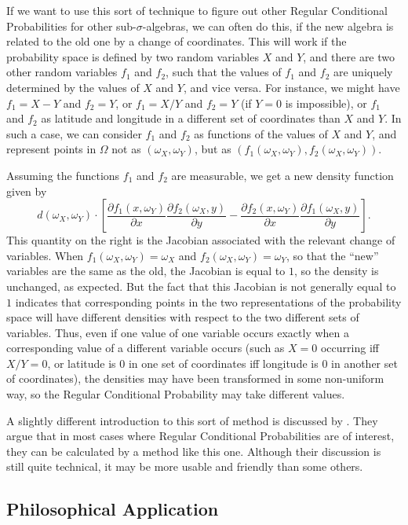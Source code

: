 If we want to use this sort of technique to figure out other Regular Conditional Probabilities for other sub-$\sigma$-algebras, we can often do this, if the new algebra is related to the old one by a change of coordinates. This will work if the probability space is defined by two random variables $X$ and $Y$, and there are two other random variables $f_1$ and $f_2$, such that the values of $f_1$ and $f_2$ are uniquely determined by the values of $X$ and $Y$, and vice versa. For instance, we might have $f_1=X-Y$ and $f_2=Y$, or $f_1=X/Y$ and $f_2=Y$ (if $Y=0$ is impossible), or $f_1$ and $f_2$ as latitude and longitude in a different set of coordinates than $X$ and $Y$. In such a case, we can consider $f_1$ and $f_2$ as functions of the values of $X$ and $Y$, and represent points in $\Omega$ not as $(\omega_X,\omega_Y)$, but as $(f_1(\omega_X,\omega_Y),f_2(\omega_X,\omega_Y))$.

Assuming the functions $f_1$ and $f_2$ are measurable, we get a new density function given by
$$d(\omega_X,\omega_Y)\cdot\left[ \frac{\partial f_1(x,\omega_Y)}{\partial x}\frac{\partial f_2(\omega_X,y)}{\partial y}-\frac{\partial f_2(x,\omega_Y)}{\partial x}\frac{\partial f_1(\omega_X,y)}{\partial y}\right].$$
This quantity on the right is the Jacobian associated with the relevant change of variables. When $f_1(\omega_X,\omega_Y)=\omega_X$ and $f_2(\omega_X,\omega_Y)=\omega_Y$, so that the ``new'' variables are the same as the old, the Jacobian is equal to $1$, so the density is unchanged, as expected. But the fact that this Jacobian is not generally equal to $1$ indicates that corresponding points in the two representations of the probability space will have different densities with respect to the two different sets of variables. Thus, even if one value of one variable occurs exactly when a corresponding value of a different variable occurs (such as $X=0$ occurring iff $X/Y=0$, or latitude is $0$ in one set of coordinates iff longitude is $0$ in another set of coordinates), the densities may have been transformed in some non-uniform way, so the Regular Conditional Probability may take different values.

A slightly different introduction to this sort of method is discussed by \citet{changpollard}. They argue that in most cases where Regular Conditional Probabilities are of interest, they can be calculated by a method like this one. Although their discussion is still quite technical, it may be more usable and friendly than some others.

\subsection{Philosophical Application}\label{philapp}

